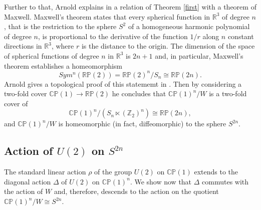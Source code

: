 \documentclass[11pt]{amsart}
\theoremstyle{definition}
\theoremstyle{remark}
\numberwithin{equation}{section}
\newcommand{\CP}{\mathbb{CP}}
\newcommand{\RP}{\mathbb{RP}}
\begin{document}
Further to that, Arnold explains in \cite{Arnold1996} a relation of Theorem \ref{first} with a theorem of Maxwell. 
    Maxwell's theorem states that every spherical function in $\mathbb{R}^3$ of degree $n$, that is the restriction to the sphere $S^2$ of a homogeneous harmonic polynomial of degree $n$, is proportional to the derivative of the function $1/r$ along $n$ constant directions in $\mathbb{R}^3$, where $r$ 
    is the distance to the origin. The dimension of the space of spherical functions of degree $n$ in $\mathbb{R}^3$ is $2n+1$ and, in particular, Maxwell's theorem establishes a homeomorphism
    \[
    Sym^n(\RP(2)) = \RP(2)^n/S_n \cong \RP(2n).
    \]
    Arnold gives a topological proof of this statememt in \cite{Arnold1996}. Then by considering a two-fold cover $\CP(1) \to \RP(2)$ he concludes that $\CP(1)^n/W$ is a two-fold cover of
    \[
    \CP(1)^n/(S_n \ltimes (\mathbb{Z}_2)^n) \cong \RP(2n),
    \]
    and $\CP(1)^n/W$ is homeomorphic (in fact, diffeomorphic) to the sphere $S^{2n}$.


\subsection{Action of $U(2)$ on $S^{2n}$}
\label{Actionsec}

The standard linear action $\rho$ of the group $U(2)$ on $\CP(1)$ extends to the diagonal action $\Delta$ of $U(2)$ on $\CP(1)^n$. We show now that $\Delta$ commutes with the action of $W$ and, therefore, descends to the action on the quotient $\CP(1)^n/W \cong S^{2n}$.
\end{document}
